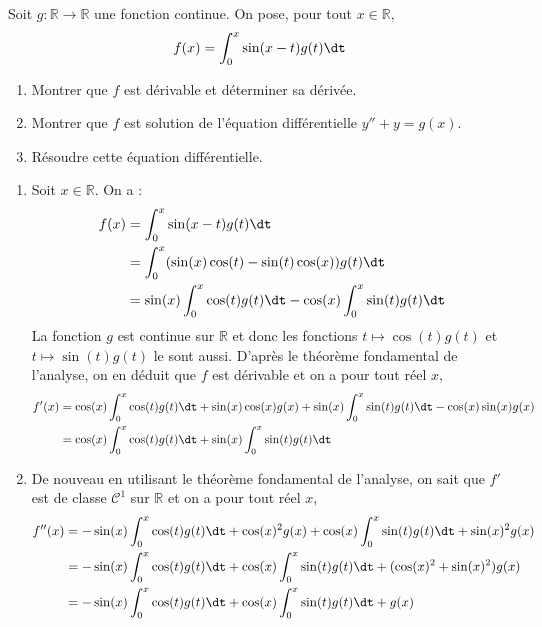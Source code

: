 \documentclass[a4paper,10pt]{report}
\begin{document}
\begin{Exa} Soit $g : \mathbb{R} \rightarrow \mathbb{R}$ une fonction continue. On pose, pour tout $x \in \mathbb{R}$,
    \[
    f(x) = \int_0^x {\sin(x - t)g(t) \dt}
    \]
    \begin{enumerate}
      \item Montrer que $f$ est dérivable et déterminer sa dérivée.
      \item Montrer que $f$ est solution de l'équation différentielle $y'' + y = g(x)$.
      \item Résoudre cette équation différentielle.
    \end{enumerate}
\end{Exa}

\begin{enumerate}
\item Soit $x \in \mathbb{R}$. On a :
\begin{align*}
f(x) &= \int_0^x \sin(x - t)g(t) \dt \\
& = \int_0^x (\sin(x)\cos(t)-\sin(t)\cos(x))g(t) \dt \\
& = \sin(x) \int_0^x \cos(t)g(t) \dt  -\cos(x) \int_0^x \sin(t)g(t) \dt \\
\end{align*}
La fonction $g$ est continue sur $\mathbb{R}$ et donc les fonctions $t \mapsto \cos(t)g(t)$ et $t \mapsto \sin(t)g(t)$ le sont aussi. D'après le théorème fondamental de l'analyse, on en déduit que $f$ est dérivable et on a pour tout réel $x$,
\begin{align*}
f'(x) & = \cos(x) \int_0^x \cos(t)g(t) \dt + \sin(x)\cos(x) g(x) + \sin(x) \int_0^x \sin(t)g(t) \dt - \cos(x) \sin(x)g(x) \\
& = \cos(x) \int_0^x \cos(t)g(t) \dt  + \sin(x) \int_0^x \sin(t)g(t) \dt 
\end{align*}
\item De nouveau en utilisant le théorème fondamental de l'analyse, on sait que $f'$ est de classe $\mathcal{C}^1$ sur $\mathbb{R}$ et on a pour tout réel $x$,
\begin{align*}
f''(x) & = - \sin(x)\int_0^x \cos(t)g(t) \dt + \cos(x)^2 g(x) + \cos(x)  \int_0^x \sin(t)g(t) \dt  + \sin(x)^2 g(x) \\
& =  - \sin(x)\int_0^x \cos(t)g(t) \dt  + \cos(x)  \int_0^x \sin(t)g(t) \dt  + (\cos(x)^2+\sin(x)^2) g(x) \\
& =  - \sin(x)\int_0^x \cos(t)g(t) \dt  + \cos(x)  \int_0^x \sin(t)g(t) \dt + g(x) \\
\end{align*}

\end{enumerate}
\end{document}
